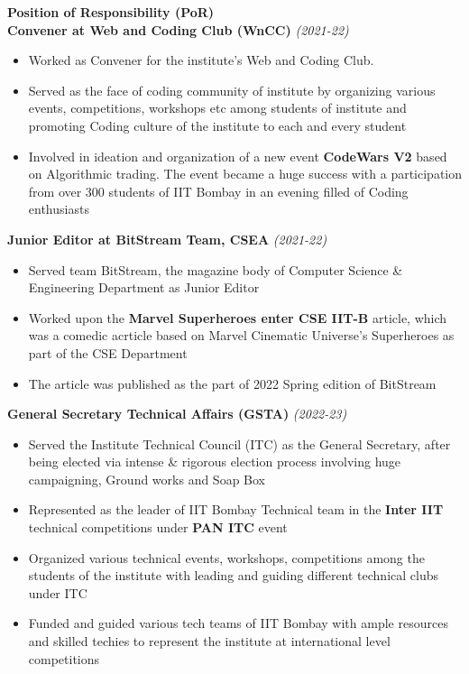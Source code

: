 \documentclass[]{article}
\begin{document}
\textcolor{blue!60!black}{\Large \textbf{Position of Responsibility (PoR)}}
\vspace{1 em}\\
\textbf{Convener at Web and Coding Club (WnCC)}
\hfill\textit{\small (2021-22)}
\begin{itemize}
    \item Worked as Convener for the institute's Web and Coding Club.
    \item Served as the face of coding community of institute by organizing various events, competitions, workshops etc among students of institute and promoting Coding culture of the institute to each and every student
    \item Involved in ideation and organization of a new event \textbf{CodeWars V2 }based on Algorithmic trading. The event became a huge success with a participation from over 300 students of IIT Bombay in an evening filled of Coding enthusiasts
\end{itemize}
\textbf{Junior Editor at BitStream Team, CSEA}
\hfill\textit{\small (2021-22)}
\begin{itemize}
    \item Served team BitStream, the magazine body of Computer Science \& Engineering Department as Junior Editor
    \item Worked upon the \textbf{Marvel Superheroes enter CSE IIT-B} article, which was a comedic acrticle based on Marvel Cinematic Universe's
    Superheroes as part of the CSE Department
    \item The article was published as the part of 2022 Spring edition of BitStream
\end{itemize}
\textbf{General Secretary Technical Affairs (GSTA)}
\hfill\textit{\small (2022-23)}
\begin{itemize}
    \item Served the Institute Technical Council (ITC) as the General Secretary, after being elected via intense \& rigorous election process involving huge campaigning, Ground works and Soap Box
    \item Represented as the leader of IIT Bombay Technical team in the \textbf{Inter IIT} technical competitions under \textbf{PAN ITC} event
    \item Organized various technical events, workshops, competitions among the students of the institute with leading and guiding different technical clubs under ITC
    \item Funded and guided various tech teams of IIT Bombay with ample resources and skilled techies to represent the institute at international level competitions
\end{itemize}
\vspace{1.25 em}
\end{document}
